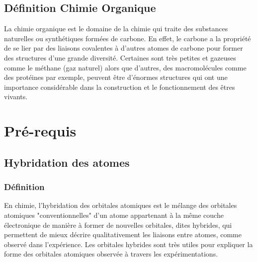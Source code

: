 \documentclass[a4paper, oneside]{book}
\begin{document}
\section*{Définition Chimie Organique}

La chimie organique est le domaine de la chimie qui traite des substances naturelles ou synthétiques formées de carbone. En effet, le carbone a la propriété de se lier par des  liaisons covalentes à d'autres atomes de carbone pour former des structures d’une grande diversité. Certaines sont très petites et gazeuses comme le méthane (gaz naturel) alors que d'autres, des macromolécules comme des protéines par exemple, peuvent être d'énormes structures qui ont une importance considérable dans la construction et le fonctionnement des êtres vivants.
\vspace*{\fill}


\chapter{Pré-requis}
\minitoc
\section{Hybridation des atomes}
\subsection{Définition}
En chimie, l'hybridation des orbitales atomiques est le mélange des orbitales atomiques "conventionnelles" d'un atome appartenant à la même couche électronique de manière à former de nouvelles orbitales, dites hybrides, qui permettent de mieux décrire qualitativement les liaisons entre atomes, comme observé dans l'expérience. Les orbitales hybrides sont très utiles pour expliquer la forme des orbitales atomiques observée à travers les expérimentations.
\end{document}
